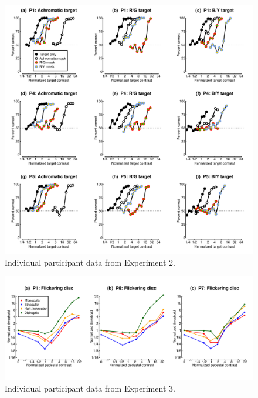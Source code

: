 \documentclass[
  letterpaper,
  DIV=11,
  numbers=noendperiod]{scrartcl}
\begin{document}
\begin{figure}

{\centering \includegraphics{Figures/individualMCS.pdf}

}

\caption{\label{fig-individualMCS}Individual participant data from
Experiment 2.}

\end{figure}

\begin{figure}

{\centering \includegraphics{Figures/individualdiscs.pdf}

}

\caption{\label{fig-individualdiscs}Individual participant data from
Experiment 3.}

\end{figure}
\end{document}
